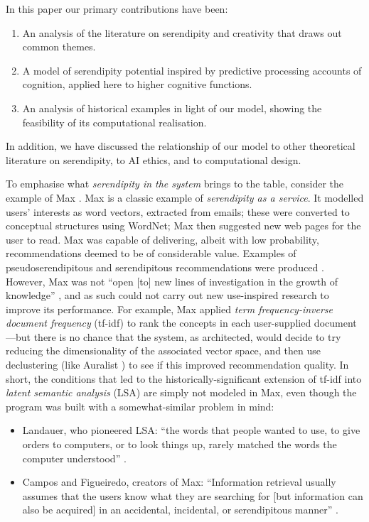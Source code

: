 
In this paper our primary contributions have been:
\begin{enumerate}[label=(\arabic*),itemsep=0pt]
  \item An analysis of the literature on serendipity and creativity
    that draws out common themes.
  \item A model of serendipity potential inspired by predictive
    processing accounts of cognition, applied here to higher cognitive
    functions.
  \item An analysis of historical examples in light of our model,
    showing the feasibility of its computational realisation.
\end{enumerate}

In addition, we have discussed the relationship of our model to other
theoretical literature on serendipity, to AI ethics, and to
computational design.

To emphasise what \emph{serendipity in the system} brings to the table, consider the example of {\sf Max}
\cite{Figueiredo2001,campos2001searching}.  {\sf Max} is a classic example
of \emph{serendipity as a service}.  It modelled users'
interests as word vectors, extracted from emails; these were converted
to conceptual structures using WordNet; {\sf Max} then suggested new
web pages for the user to read.  {\sf Max} was capable of delivering,
albeit with low probability, recommendations deemed to be of
considerable value.  Examples of pseudoserendipitous and serendipitous
recommendations were produced \cite[p.~59]{Figueiredo2001}.
However, {\sf Max} was not ``open [to] new lines of
investigation in the growth of knowledge''
\cite{swanson1997interactive}, and as such could not carry out
new use-inspired research to improve its performance.  For example,
{\sf Max} applied \emph{term frequency-inverse document frequency}
(tf-idf) to rank the concepts in each user-supplied document
\cite[p.~160]{campos2001searching}---but there is no chance that the
system, as architected, would decide to try reducing the dimensionality
of the associated vector space, and then use declustering (like {\sf
  Auralist} \cite{Zhang2011}) to see if this improved recommendation
quality.  In short, the conditions that led to the historically-significant
extension of tf-idf into \emph{latent
  semantic analysis} (LSA) are simply not modeled in {\sf Max}, even
though the program was built with a somewhat-similar problem in mind:
\begin{itemize}
\item Landauer, who pioneered LSA: ``the words that people wanted to
  use, to give orders to computers, or to look things up, rarely
  matched the words the computer understood'' \cite{landauer2003pasteur}.
\item Campos and Figueiredo, creators of {\sf Max}: ``Information retrieval usually
  assumes that the users know what they are searching for [but information can also be acquired] in an accidental, incidental, or
  serendipitous manner'' \cite{campos2001searching}.
\end{itemize}

